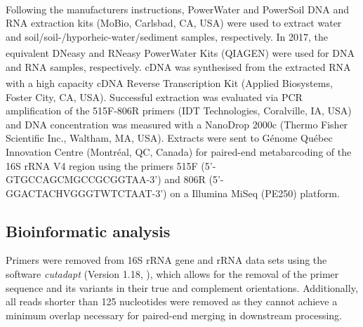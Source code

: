 \documentclass[12pt,a4paper]{article} %
\begin{document}
Following the manufacturers instructions, PowerWater\textsuperscript{\textregistered} and PowerSoil\textsuperscript{\textregistered} DNA and RNA extraction kits (MoBio, Carlsbad, CA, USA) were used to extract water and soil/soil-/hyporheic-water/sediment samples, respectively. In 2017, the equivalent DNeasy\textsuperscript{\textregistered} and RNeasy\textsuperscript{\textregistered} PowerWater\textsuperscript{\textregistered} Kits (QIAGEN\textsuperscript{\textregistered}) were used for DNA and RNA samples, respectively. cDNA was synthesised from the extracted RNA with a high capacity cDNA Reverse Transcription Kit (Applied Biosystems\textsuperscript{\texttrademark}, Foster City, CA, USA). Successful extraction was evaluated via PCR amplification of the 515F-806R primers (IDT Technologies, Coralville, IA, USA) and DNA concentration was measured with a NanoDrop 2000c (Thermo Fisher Scientific Inc., Waltham, MA, USA). Extracts were sent to G\'{e}nome Qu\'{e}bec Innovation Centre (Montr\'{e}al, QC, Canada) for paired-end metabarcoding of the 16S rRNA V4 region using the primers 515F (5'-GTGCCAGCMGCCGCGGTAA-3') and 806R (5'-GGACTACHVGGGTWTCTAAT-3') on a Illumina MiSeq (PE250) platform.

\subsection*{Bioinformatic analysis}
Primers were removed from 16S rRNA gene and rRNA data sets using the software \textit{cutadapt} (Version 1.18, \citet{Martin2013}), which allows for the removal of the primer sequence and its variants in their true and complement orientations. Additionally, all reads shorter than 125 nucleotides were removed as they cannot achieve a minimum overlap necessary for paired-end merging in downstream processing.
\end{document}
